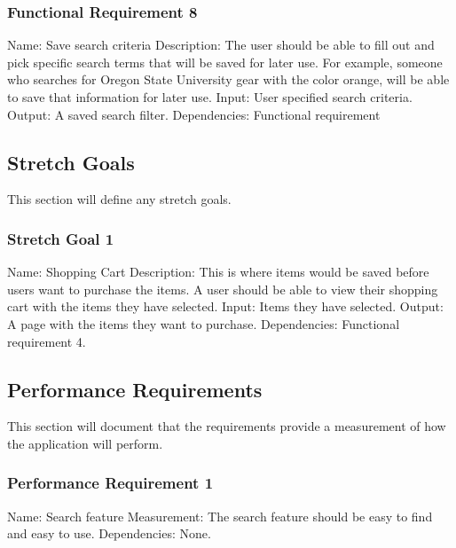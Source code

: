 \documentclass[journal,compsoc, 10pt, draftclsnofoot, onecolumn]{IEEEtran}
\begin{document}
\subsubsection{Functional Requirement 8}
Name: Save search criteria
Description: The user should be able to fill out and pick specific search terms
that will be saved for later use. For example, someone who searches for Oregon 
State University gear with the color orange, will be able to save that information
for later use.\newline
Input: User specified search criteria.\newline
Output: A saved search filter.\newline
Dependencies: Functional requirement 

\subsection{Stretch Goals}

This section will define any stretch goals.

\subsubsection{Stretch Goal 1}
Name: Shopping Cart\newline
Description: This is where items would be saved before users want to
purchase the items. A user should be able to view their shopping cart with
the items they have selected.\newline
Input: Items they have selected.\newline
Output: A page with the items they want to purchase.\newline
Dependencies: Functional requirement 4.

\subsection{Performance Requirements}

This section will document that the requirements provide a measurement of how 
the application will perform.

\subsubsection{Performance Requirement 1}
Name: Search feature\newline
Measurement: The search feature should be easy to find and easy to use.\newline
Dependencies: None.
\end{document}
